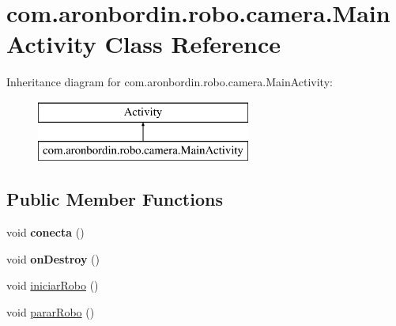 \hypertarget{classcom_1_1aronbordin_1_1robo_1_1camera_1_1MainActivity}{\section{com.\+aronbordin.\+robo.\+camera.\+Main\+Activity Class Reference}
\label{classcom_1_1aronbordin_1_1robo_1_1camera_1_1MainActivity}
}
Inheritance diagram for com.\+aronbordin.\+robo.\+camera.\+Main\+Activity\+:\begin{figure}[H]
\begin{center}
\leavevmode
\includegraphics[height=2.000000cm]{dd/da1/classcom_1_1aronbordin_1_1robo_1_1camera_1_1MainActivity}
\end{center}
\end{figure}
\subsection*{Public Member Functions}
\begin{DoxyCompactItemize}
\item 
\hypertarget{classcom_1_1aronbordin_1_1robo_1_1camera_1_1MainActivity_a625135e8a1e3c7e90cf58846fb9bd701}{void {\bfseries conecta} ()}\label{classcom_1_1aronbordin_1_1robo_1_1camera_1_1MainActivity_a625135e8a1e3c7e90cf58846fb9bd701}

\item 
\hypertarget{classcom_1_1aronbordin_1_1robo_1_1camera_1_1MainActivity_aa93ba91edf8ce75af986c2b514dcb2f5}{void {\bfseries on\+Destroy} ()}\label{classcom_1_1aronbordin_1_1robo_1_1camera_1_1MainActivity_aa93ba91edf8ce75af986c2b514dcb2f5}

\item 
void \hyperlink{classcom_1_1aronbordin_1_1robo_1_1camera_1_1MainActivity_a6cf29e225705388ac8f1314d6c7db928}{iniciar\+Robo} ()
\item 
void \hyperlink{classcom_1_1aronbordin_1_1robo_1_1camera_1_1MainActivity_a05fe1bfdbf4e461a6078cf3353a9da83}{parar\+Robo} ()
\end{DoxyCompactItemize}
